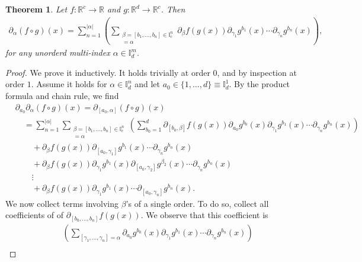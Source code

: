 \documentclass[12pt]{amsart}
\newcommand{\R}{\ensuremath{\mathbb{R}}}
\newtheorem{thm}{Theorem}
\begin{document}
\begin{thm}
Let $f:\R^c \to \R$ and $g:\R^d \to \R^c$.  Then
\begin{align*}
  \partial_\alpha( f \circ g)(x) = \sum_{n=1}^{|\alpha|} \left(
  \sum_{ 
    \substack{
      \beta = [b_1,\dots,b_n] \in \mathbb{I}^n_c \\
      [\gamma_1 ,\dots, \gamma_n ] = \alpha 
      }
    }
    \partial_\beta f(g(x)) \partial_{\gamma_1} g^{b_1}(x) \cdots \partial_{\gamma_n} g^{b_n}(x)
  \right),
\end{align*}
  for any unorderd multi-index $\alpha \in \mathbb{I}^{m}_d$.
\end{thm}
\begin{proof}
  We prove it inductively.  It holds trivially at order $0$,
  and by inspection at order $1$.
  Assume it holds for $\alpha \in \mathbb{I}^n_d$
  and let $a_0 \in \{ 1,\dots,d\} \equiv \mathbb{I}_d^1$.
  By the product formula and chain rule, we find
  \begin{align*}
    &\partial_{a_0}\partial_\alpha( f \circ g)(x) = 
    \partial_{[a_0,\alpha]}( f \circ g)(x) \\
    &\quad =\sum_{n=1}^{|\alpha|}
    \sum_{ 
      \substack{
        \beta = [b_1,\dots,b_n] \in \mathbb{I}_c^n \\
        [\gamma_1,\dots,\gamma_n] = \alpha 
        }
      }
      \left( \sum_{b_0=1}^d
        \partial_{[b_0,\beta]} f(g(x))
        \partial_{a_0} g^{b_0}(x)
        \partial_{\gamma_1} g^{b_1}(x) \cdots
        \partial_{\gamma_n} g^{b_n}(x)
      \right)\\
      &\qquad + \partial_{\beta} f(g(x))
      \partial_{[a_0,\gamma_1]} g^{b_1}(x) \cdots
      \partial_{\gamma_n} g^{b_n}(x) \\
      &\qquad + \partial_{\beta} f(g(x))
      \partial_{\gamma_1} g^{b_1}(x) 
      \partial_{[a_0,\gamma_2]} g^{\beta_2}(x)  \cdots
      \partial_{\gamma_n} g^{b_n}(x) \\
      &\qquad \vdots \\
      &\qquad + \partial_{\beta} f(g(x))
      \partial_{\gamma_1} g^{b_1}(x) \cdots
      \partial_{[a_0,\gamma_n]} g^{b_n}(x) . 
  \end{align*}
We now collect terms involving $\beta$'s of a single order.
To do so, collect all coefficients of of $\partial_{[b_0,\dots,b_n]} f(g(x))$.
We observe that this coefficient is
\begin{align*}
&   \left( \sum_{ [\gamma_1,\dots,\gamma_n] = \alpha}
   \partial_{a_0}g^{b_0}(x) \partial_{\gamma_1} g^{b_1}(x) \cdots \partial_{\gamma_n}g^{b_n}(x) \right) \\

\end{align*}
\end{proof}
\end{document}
